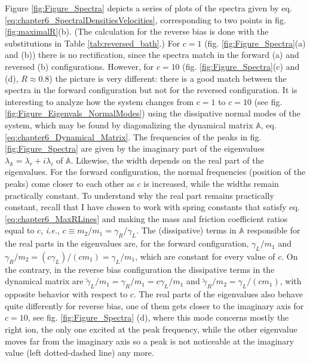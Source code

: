 %
Figure \ref{fig:Figure_Spectra} depicts a series of plots of the spectra given by eq. \eqref{eq:chapter6_SpectralDensitiesVelocities}, corresponding to two points in fig. \ref{fig:maximalR}(b). (The calculation for the reverse bias is done with the substitutions in Table \ref{tab:reversed_bath}.)
For $c=1$ (fig. \ref{fig:Figure_Spectra}(a) and (b)) there is no rectification, since the spectra match in the forward (a) and reversed (b) configurations. However, for $c=10$ (fig. \ref{fig:Figure_Spectra}(c) and (d), $R\approx 0.8$) the picture is very different: there is a good match between the spectra in the forward configuration but not for the reversed configuration. It is interesting to analyze how the system changes from $c=1$ to $c=10$ (see fig. \ref{fig:Figure_Eigenvals_NormalModes}) using the dissipative normal modes of the system, which may be found by diagonalizing the dynamical matrix $\mathbb{A}$, eq. \eqref{eq:chapter6_Dynamical_Matrix}. The frequencies of the peaks in fig. \ref{fig:Figure_Spectra} are given by the imaginary part of the eigenvalues $\lambda_\mathbb{A} = \lambda_r + i \lambda_i$ of $\mathbb{A}$. Likewise, the width depends on  the real part of the eigenvalues. For the forward configuration, the normal frequencies (position of the peaks) come closer to each other as $c$ is increased, while the widths remain practically constant. To understand why the real part remains practically constant, recall that I have chosen to work with spring constants that satisfy eq. \eqref{eq:chapter6_MaxRLines} and making the mass and friction coefficient ratios equal to $c$, \textit{i.e.}, $ c\equiv m_2/m_1 = \gamma_R/\gamma_L$. The (dissipative) terms in $\mathbb{A}$ responsible for the real parts in the eigenvalues are,
for the forward configuration,  $\gamma_L/m_1$ and $\gamma_R/m_2 = (c \gamma_L)/(c m_1) = \gamma_L/m_1$, which are constant for every value of $c$. On the contrary, in the reverse bias configuration  the dissipative terms in the dynamical matrix  are $\tilde{\gamma}_L/m_1 = \gamma_R/m_1 = c\gamma_L/m_1$ and $\tilde{\gamma}_R/m_2 = \gamma_L/ (c m_1)$, with opposite behavior with respect to $c$. The real parts of the eigenvalues
also behave quite differently for reverse bias, one of them gets closer to the imaginary axis for $c=10$,
see fig. \ref{fig:Figure_Spectra} (d), where this mode  concerns mostly the right ion,
the only one excited at the peak frequency, while the other eigenvalue  moves far from the imaginary axis so a peak is not noticeable
at the imaginary value (left dotted-dashed line) any more.

